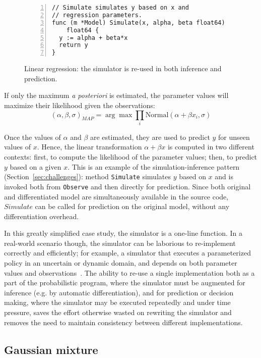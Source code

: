 \documentclass[sigplan,review,10pt,anonymous]{acmart}
\begin{document}
\begin{sloppypar}
\begin{figure}
\begin{lstlisting}[framexleftmargin=10pt,numbers=left]
// Simulate simulates y based on x and 
// regression parameters.
func (m *Model) Simulate(x, alpha, beta float64)
    float64 {
  y := alpha + beta*x
  return y
}
\end{lstlisting}
\caption{Linear regression: the simulator is re-used in both
  inference and prediction.}
\label{fig:linear-regression}
\end{figure}
If only the maximum \textit{a posteriori} is estimated, the
parameter values will maximize their likelihood given the
observations:
\begin{equation}
	(\alpha, \beta, \sigma)_{MAP} = \arg \max \prod\limits_i \mathrm{Normal}(\alpha + \beta x_i, \sigma)
	\label{eqn:linear-regression-2}
\end{equation}

Once the values of $\alpha$ and $\beta$ are estimated, they are
used to predict $y$ for unseen values of $x$. Hence, the linear
transformation $\alpha + \beta x$ is computed in two different
contexts: first, to compute the likelihood of the parameter
values; then, to predict $y$ based on a given $x$. This is an
example of the simulation-inference pattern
(Section~\ref{sec:challenges}): method \lstinline{Simulate}
simulates $y$ based on $x$ and is invoked both from
\lstinline{Observe} and then directly for prediction.  Since
both original and differentiated model are simultaneously
available in the source code, $Simulate$ can be called
for prediction on the original model, without any
differentiation overhead. 

In this greatly simplified case study, the simulator is a
one-line function. In a real-world scenario though, the
simulator can be laborious to re-implement correctly and
efficiently; for example, a simulator that executes a
parameterized policy in an uncertain or dynamic domain, and
depends on both parameter values and observations~\cite{MPT+16}.
The ability to re-use a single implementation both as a part of
the probabilistic program, where the simulator must be augmented
for inference (e.g. by automatic differentiation), and for
prediction or decision making, where the simulator may be
executed repeatedly and under time pressure, saves the effort
otherwise wasted on rewriting the simulator and removes the need
to maintain consistency between different implementations.

\subsection{Gaussian mixture}
\label{sec:gaussian-mixture}


\end{sloppypar}
\end{document}
